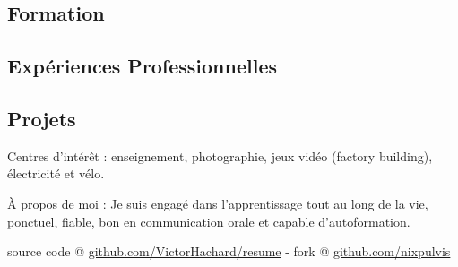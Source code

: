 





\vspace{-0.2em}


\subsection*{Formation}


\subsection*{Expériences Professionnelles}


\subsection*{Projets}


\begin{indentsection}{\parindent}
\begin{description*}
  \item[Centres d'intérêt :]
    enseignement, photographie, jeux vidéo (factory building), électricité et vélo.
  \item[À propos de moi :]
    Je suis engagé dans l'apprentissage tout au long de la vie, ponctuel, fiable,
    bon en communication orale et capable d'autoformation.
\end{description*}
\end{indentsection}

\begin{center}
\footnotesize \latex source code @
\href{http://www.github.com/VictorHachard/resume}
{github.com/VictorHachard/resume} - fork @
\href{http://www.github.com/nixpulvis}
{github.com/nixpulvis}
\end{center}

